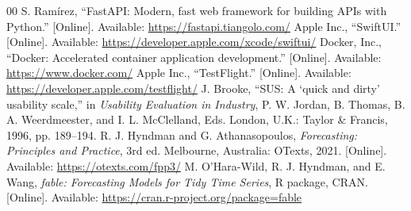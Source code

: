 \documentclass[conference]{IEEEtran}
\begin{document}
\begin{thebibliography}{00}
 S. Ram\'irez, ``FastAPI: Modern, fast web framework for building APIs with Python.'' [Online]. Available: \url{https://fastapi.tiangolo.com/}
 Apple Inc., ``SwiftUI.'' [Online]. Available: \url{https://developer.apple.com/xcode/swiftui/}
 Docker, Inc., ``Docker: Accelerated container application development.'' [Online]. Available: \url{https://www.docker.com/}
 Apple Inc., ``TestFlight.'' [Online]. Available: \url{https://developer.apple.com/testflight/}
 J. Brooke, ``SUS: A `quick and dirty' usability scale,'' in \emph{Usability Evaluation in Industry}, P. W. Jordan, B. Thomas, B. A. Weerdmeester, and I. L. McClelland, Eds. London, U.K.: Taylor \& Francis, 1996, pp. 189--194.
 R. J. Hyndman and G. Athanasopoulos, \emph{Forecasting: Principles and Practice}, 3rd ed. Melbourne, Australia: OTexts, 2021. [Online]. Available: \url{https://otexts.com/fpp3/}
 M. O'Hara-Wild, R. J. Hyndman, and E. Wang, \emph{fable: Forecasting Models for Tidy Time Series}, R package, CRAN. [Online]. Available: \url{https://cran.r-project.org/package=fable}
\end{thebibliography}
\end{document}
